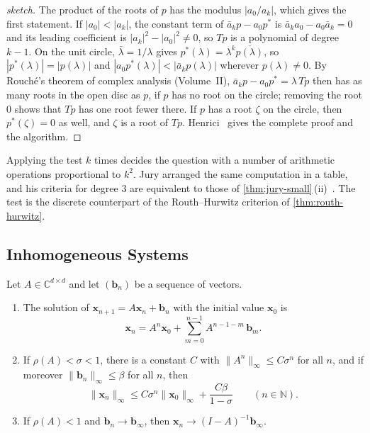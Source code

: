 \begin{proof}[sketch]
The product of the roots of $p$ has the modulus $|a_0/a_k|$, which gives the first statement. If $|a_0|<|a_k|$, the constant term of $\bar a_kp-a_0p^*$ is $\bar a_ka_0-a_0\bar a_k=0$ and its leading coefficient is $|a_k|^2-|a_0|^2\ne0$, so $Tp$ is a polynomial of degree $k-1$. On the unit circle, $\bar\lambda=1/\lambda$ gives $p^*(\lambda)=\lambda^k\overline{p(\lambda)}$, so $|p^*(\lambda)|=|p(\lambda)|$ and $|a_0p^*(\lambda)|<|\bar a_kp(\lambda)|$ wherever $p(\lambda)\ne0$. By Rouch\'e's theorem of complex analysis (Volume~II), $\bar a_kp-a_0p^*=\lambda\,Tp$ then has as many roots in the open disc as $p$, if $p$ has no root on the circle; removing the root $0$ shows that $Tp$ has one root fewer there. If $p$ has a root $\zeta$ on the circle, then $p^*(\zeta)=0$ as well, and $\zeta$ is a root of $Tp$. Henrici~\cite{henrici1974} gives the complete proof and the algorithm.
\end{proof}

Applying the test $k$ times decides the question with a number of arithmetic operations proportional to $k^2$. Jury arranged the same computation in a table, and his criteria for degree $3$ are equivalent to those of \cref{thm:jury-small}\,(ii)~\cite{jury1964}. The test is the discrete counterpart of the Routh--Hurwitz criterion of \cref{thm:routh-hurwitz}.

\subsection{Inhomogeneous Systems}

\begin{theorem}
\label{thm:discrete-duhamel}
Let $A\in\mathbb C^{d\times d}$ and let $(\mathbf b_n)$ be a sequence of vectors.
\begin{enumerate}
\item The solution of $\mathbf x_{n+1}=A\mathbf x_n+\mathbf b_n$ with the initial value $\mathbf x_0$ is
\begin{equation}
\mathbf x_n=A^n\mathbf x_0+\sum_{m=0}^{n-1}A^{n-1-m}\,\mathbf b_m .
\label{eq:discrete-duhamel}
\end{equation}
\item If $\rho(A)<\sigma<1$, there is a constant $C$ with $\|A^n\|_\infty\le C\sigma^n$ for all $n$, and if moreover $\|\mathbf b_n\|_\infty\le\beta$ for all $n$, then
\[
\|\mathbf x_n\|_\infty\le C\sigma^n\|\mathbf x_0\|_\infty+\frac{C\beta}{1-\sigma}\qquad(n\in\mathbb N).
\]
\item If $\rho(A)<1$ and $\mathbf b_n\to\mathbf b_\infty$, then $\mathbf x_n\to(I-A)^{-1}\mathbf b_\infty$.
\end{enumerate}
\end{theorem}

